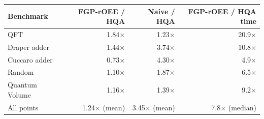 \begin{tabular}{lrrr}
\toprule
Benchmark & FGP-rOEE / HQA & Naive / HQA & FGP-rOEE / HQA time \\
\midrule
QFT & 1.84$\times$ & 1.23$\times$ & 20.9$\times$ \\
Draper adder & 1.44$\times$ & 3.74$\times$ & 10.8$\times$ \\
Cuccaro adder & 0.73$\times$ & 4.30$\times$ & 4.9$\times$ \\
Random & 1.10$\times$ & 1.87$\times$ & 6.5$\times$ \\
Quantum Volume & 1.16$\times$ & 1.39$\times$ & 9.2$\times$ \\
\midrule
All points & 1.24$\times$ (mean) & 3.45$\times$ (mean) & 7.8$\times$ (median) \\
\bottomrule
\end{tabular}

